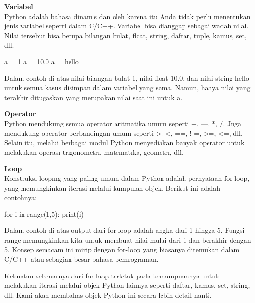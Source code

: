 \documentclass[
  letterpaper,
  DIV=11,
  numbers=noendperiod]{scrreprt}
\newenvironment{Shaded}{\begin{snugshade}}{\end{snugshade}}
\newcommand{\BuiltInTok}[1]{\textcolor[rgb]{0.00,0.23,0.31}{#1}}
\newcommand{\ControlFlowTok}[1]{\textcolor[rgb]{0.00,0.23,0.31}{#1}}
\newcommand{\DecValTok}[1]{\textcolor[rgb]{0.68,0.00,0.00}{#1}}
\newcommand{\FloatTok}[1]{\textcolor[rgb]{0.68,0.00,0.00}{#1}}
\newcommand{\KeywordTok}[1]{\textcolor[rgb]{0.00,0.23,0.31}{#1}}
\newcommand{\NormalTok}[1]{\textcolor[rgb]{0.00,0.23,0.31}{#1}}
\newcommand{\OperatorTok}[1]{\textcolor[rgb]{0.37,0.37,0.37}{#1}}
\newcommand{\StringTok}[1]{\textcolor[rgb]{0.13,0.47,0.30}{#1}}
\begin{document}
\textbf{Variabel}\\
Python adalah bahasa dinamis dan oleh karena itu Anda tidak perlu
menentukan jenis variabel seperti dalam C/C++. Variabel bisa dianggap
sebagai wadah nilai. Nilai tersebut bisa berupa bilangan bulat, float,
string, daftar, tuple, kamus, set, dll.

\begin{Shaded}
\begin{Highlighting}[]
\NormalTok{a }\OperatorTok{=} \DecValTok{1}
\NormalTok{a }\OperatorTok{=} \FloatTok{10.0}
\NormalTok{a }\OperatorTok{=} \StringTok{\textquotesingle{}hello\textquotesingle{}}
\end{Highlighting}
\end{Shaded}

Dalam contoh di atas nilai bilangan bulat 1, nilai float 10.0, dan nilai
string hello untuk semua kasus disimpan dalam variabel yang sama. Namun,
hanya nilai yang terakhir ditugaskan yang merupakan nilai saat ini untuk
a.

\textbf{Operator}\\
Python mendukung semua operator aritmatika umum seperti +, ---, *, /.
Juga mendukung operator perbandingan umum seperti \textgreater,
\textless, ==, ! =, \textgreater=, \textless=, dll. Selain itu, melalui
berbagai modul Python menyediakan banyak operator untuk melakukan
operasi trigonometri, matematika, geometri, dll.

\textbf{Loop}\\
Konstruksi looping yang paling umum dalam Python adalah pernyataan
for-loop, yang memungkinkan iterasi melalui kumpulan objek. Berikut ini
adalah contohnya:

\begin{Shaded}
\begin{Highlighting}[]
\ControlFlowTok{for}\NormalTok{ i }\KeywordTok{in} \BuiltInTok{range}\NormalTok{(}\DecValTok{1}\NormalTok{,}\DecValTok{5}\NormalTok{): }
    \BuiltInTok{print}\NormalTok{(i)}
\end{Highlighting}
\end{Shaded}

Dalam contoh di atas output dari for-loop adalah angka dari 1 hingga 5.
Fungsi range memungkinkan kita untuk membuat nilai mulai dari 1 dan
berakhir dengan 5. Konsep semacam ini mirip dengan for-loop yang
biasanya ditemukan dalam C/C++ atau sebagian besar bahasa pemrograman.

Kekuatan sebenarnya dari for-loop terletak pada kemampuannya untuk
melakukan iterasi melalui objek Python lainnya seperti daftar, kamus,
set, string, dll. Kami akan membahas objek Python ini secara lebih
detail nanti.
\end{document}
